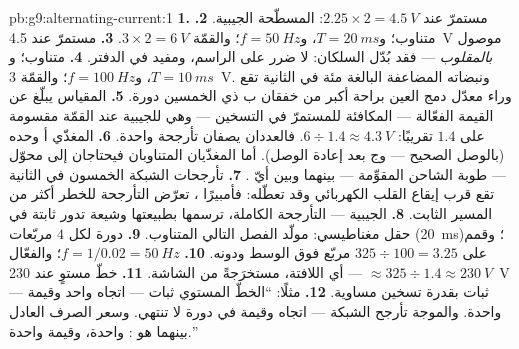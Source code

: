 \begin{solution}{pb:g9:alternating-current:1}
\textbf{1.} مستمرّ عند $2.25 \times 2 = \qty{4.5}{V}$:
 المسطّحة الجيبية.
\textbf{2.} متناوب؛ و$T = \qty{20}{ms}$، و$f = \qty{50}{Hz}$؛
والقمّة $3 \times 2 = \qty{6}{V}$.
\textbf{3.} مستمرّ عند \qty{4.5}{V} موصول \emph{بالمقلوب} ---
فقد بُدّل السلكان: لا ضرر على الراسم، ومفيد في الدفتر.
\textbf{4.} متناوب؛ و$T = \qty{10}{ms}$، و$f = \qty{100}{Hz}$؛
والقمّة \qty{3}{V}. ونبضاته المضاعفة البالغة مئة في الثانية
تقع وراء معدّل دمج العين براحة أكبر من خفقان ب ذي الخمسين
دورة.
\textbf{5.} المقياس يبلّغ عن القيمة الفعّالة --- المكافئة
للمستمرّ في التسخين --- وهي للجيبية عند القمّة مقسومة على
$1.4$ تقريبًا: $6 \div 1.4 \approx \qty{4.3}{V}$. فالعددان
يصفان تأرجحة واحدة.
\textbf{6.} المغذّي أ وحده (بالوصل الصحيح --- وج بعد إعادة
الوصل). أما المغذّيان المتناوبان فيحتاجان إلى محوّل ---
طوبة الشاحن المقوِّمة --- بينهما وبين أيّ .
\textbf{7.} تأرجحات الشبكة الخمسون في الثانية تقع قرب إيقاع
القلب الكهربائي وقد تعطّله: فأمبيرًا ، تعرّض التأرجحة
للخطر أكثر من المسير الثابت.
\textbf{8.} الجيبية --- التأرجحة الكاملة، ترسمها بطبيعتها
وشيعة تدور  ثابتة في حقل مغناطيسي: مولّد الفصل التالي
المتناوب.
\textbf{9.} دورة لكل $4$ مربّعات (\qty{20}{ms})؛ وقمم على
$325 \div 100 = 3.25$ مربّع فوق الوسط ودونه.
\textbf{10.} $f = 1/0.02 = \qty{50}{Hz}$؛ والفعّال $\approx
325 \div 1.4 \approx \qty{230}{V}$ --- أي اللافتة، مستخرَجةً
من الشاشة.
\textbf{11.} خطّ مستوٍ عند \qty{230}{V} --- ثبات بقدرة تسخين
مساوية.
\textbf{12.} مثلًا: ``الخطّ المستوي ثبات  --- اتجاه
واحد وقيمة واحدة. والموجة تأرجح الشبكة --- اتجاه وقيمة في
دورة لا تنتهي. وسعر الصرف العادل بينهما هو :
 واحدة، وقيمة واحدة.''
\end{solution}
